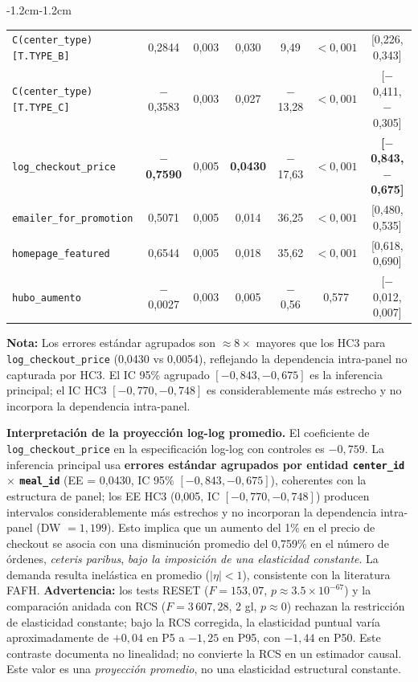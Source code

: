 \documentclass[doc, a4paper, biblatex, floatsintext, longtable, babel]{apa7}
\begin{document}
\begin{table}[!htbp]
\begin{adjustwidth}{-1.2cm}{-1.2cm}
\begin{tabular}{lcccccc}
\texttt{C(center\_type)[T.TYPE\_B]} & 0,2844 & 0,003 & 0,030 & 9,49 & $<0,001$ & [0,226, 0,343] \\
\texttt{C(center\_type)[T.TYPE\_C]} & $-$0,3583 & 0,003 & 0,027 & $-$13,28 & $<0,001$ & [$-$0,411, $-$0,305] \\
\texttt{log\_checkout\_price} & \textbf{$-$0,7590} & 0,005 & \textbf{0,0430} & $-$17,63 & $<0,001$ & \textbf{[$-$0,843, $-$0,675]} \\
\texttt{emailer\_for\_promotion} & 0,5071 & 0,005 & 0,014 & 36,25 & $<0,001$ & [0,480, 0,535] \\
\texttt{homepage\_featured} & 0,6544 & 0,005 & 0,018 & 35,62 & $<0,001$ & [0,618, 0,690] \\
\texttt{hubo\_aumento} & $-$0,0027 & 0,003 & 0,005 & $-$0,56 & 0,577 & [$-$0,012, 0,007] \\
\bottomrule
\end{tabular}
\end{adjustwidth}
\end{table}

\textbf{Nota:} Los errores estándar agrupados son $ \approx 8\times$ mayores que los HC3 para \texttt{log\_checkout\_price} (0,0430 vs 0,0054), reflejando la dependencia intra-panel no capturada por HC3. El IC 95\% agrupado $[-0,843, -0,675]$ es la inferencia principal; el IC HC3 $[-0,770, -0,748]$ es considerablemente más estrecho y no incorpora la dependencia intra-panel.

\textbf{Interpretaci\'on de la proyecci\'on log-log promedio.} El coeficiente de \texttt{log\_checkout\_price} en la especificaci\'on log-log con controles es $-0,759$. La inferencia principal usa \textbf{errores estándar agrupados por entidad \texttt{center\_id} $\times$ \texttt{meal\_id}} (EE = 0,0430, IC 95\% $[-0,843, -0,675]$), coherentes con la estructura de panel; los EE HC3 (0,005, IC $[-0,770, -0,748]$) producen intervalos considerablemente más estrechos y no incorporan la dependencia intra-panel (DW $=1,199$). Esto implica que un aumento del 1\% en el precio de checkout se asocia con una disminuci\'on promedio del 0,759\% en el n\'umero de \'ordenes, \textit{ceteris paribus}, \emph{bajo la imposición de una elasticidad constante}. La demanda resulta inel\'astica en promedio ($|\eta| < 1$), consistente con la literatura FAFH. \textbf{Advertencia:} los tests RESET ($F=153,07$, $p \approx 3.5 \times 10^{-67}$) y la comparación anidada con RCS ($F=3\,607,28$, 2 gl, $p \approx0$) rechazan la restricción de elasticidad constante; bajo la RCS corregida, la elasticidad puntual varía aproximadamente de $+0,04$ en P5 a $-1,25$ en P95, con $-1,44$ en P50. Este contraste documenta no linealidad; no convierte la RCS en un estimador causal. Este valor es una \emph{proyección promedio}, no una elasticidad estructural constante.
\end{document}
